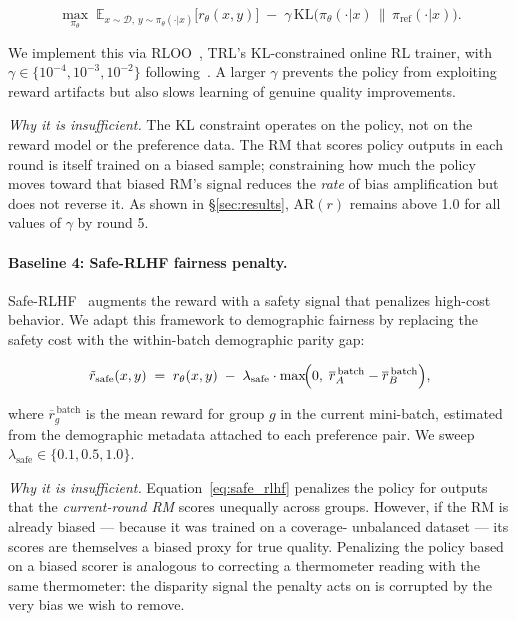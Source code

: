 \begin{equation}
    \max_{\pi_\theta}\;
    \mathbb{E}_{x \sim \mathcal{D},\, y \sim \pi_\theta(\cdot|x)}
    \bigl[r_\theta(x, y)\bigr]
    \;-\;
    \gamma \, \mathrm{KL}\!\bigl(\pi_\theta(\cdot|x) \,\|\, \pi_{\mathrm{ref}}(\cdot|x)\bigr).
\label{eq:kl_ppo}
\end{equation}

We implement this via RLOO~\citep{kool2019buy}, TRL's KL-constrained
online RL trainer, with $\gamma \in \{10^{-4}, 10^{-3}, 10^{-2}\}$
following~\citet{wolf2024tradeoffs}.
A larger $\gamma$ prevents the policy from exploiting reward artifacts but
also slows learning of genuine quality improvements.

\emph{Why it is insufficient.}
The KL constraint operates on the policy, not on the reward model or the
preference data.
The RM that scores policy outputs in each round is itself trained on a biased
sample; constraining how much the policy moves toward that biased RM's signal
reduces the \emph{rate} of bias amplification but does not reverse it.
As shown in \S\ref{sec:results}, $\mathrm{AR}(r)$ remains above 1.0 for all
values of $\gamma$ by round 5.

\paragraph{Baseline 4: Safe-RLHF fairness penalty.}
Safe-RLHF~\citep{dai2023safe} augments the reward with a safety signal that
penalizes high-cost behavior.
We adapt this framework to demographic fairness by replacing the safety cost
with the within-batch demographic parity gap:

\begin{equation}
    \tilde{r}_{\mathrm{safe}}(x, y) \;=\;
    r_\theta(x, y)
    \;-\;
    \lambda_{\mathrm{safe}} \cdot
    \max\!\Bigl(0,\;
    \overline{r}_A^{\,\mathrm{batch}} - \overline{r}_B^{\,\mathrm{batch}}
    \Bigr),
\label{eq:safe_rlhf}
\end{equation}

where $\overline{r}_g^{\,\mathrm{batch}}$ is the mean reward for group $g$ in
the current mini-batch, estimated from the demographic metadata attached to each
preference pair.
We sweep $\lambda_{\mathrm{safe}} \in \{0.1, 0.5, 1.0\}$.

\emph{Why it is insufficient.}
Equation~\eqref{eq:safe_rlhf} penalizes the policy for outputs that the
\emph{current-round RM} scores unequally across groups.
However, if the RM is already biased — because it was trained on a coverage-
unbalanced dataset — its scores are themselves a biased proxy for true quality.
Penalizing the policy based on a biased scorer is analogous to correcting a
thermometer reading with the same thermometer: the disparity signal the penalty
acts on is corrupted by the very bias we wish to remove.

